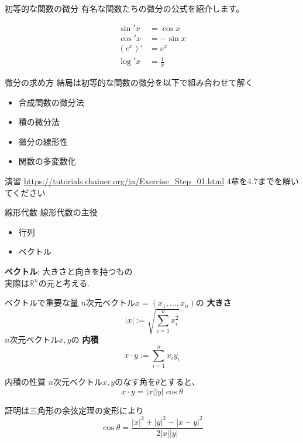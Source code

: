 \begin{frame}{初等的な関数の微分}
有名な関数たちの微分の公式を紹介します。

  \begin{align*}
  \sin' x &= \cos x \\
  \cos' x &= - \sin x \\
  (e^{x})' &= e^x \\
  \log' x &= \frac{1}{x}
  \end{align*}
\end{frame}


\begin{frame}{微分の求め方}
結局は初等的な関数の微分を以下で組み合わせて解く
\begin{itemize}
\item 合成関数の微分法
\item 積の微分法
\item 微分の線形性
\item 関数の多変数化
\end{itemize}
\end{frame}

\begin{frame}{演習}
\url{https://tutorials.chainer.org/ja/Exercise_Step_01.html}
4章を4.7までを解いてください
\end{frame}

\begin{frame}{線形代数}
線形代数の主役
\begin{itemize}
  \item 行列
  \item ベクトル
\end{itemize}
\textbf{ベクトル}: 大きさと向きを持つもの \\
実際は$\mathbb{R}^n$の元と考える.
\end{frame}


\begin{frame}{ベクトルで重要な量}
$n$次元ベクトル$x = (x_1,\dots,x_n)$の \textbf{大きさ}
  \begin{equation*}
  |x|:= \sqrt{\sum_{i=1}^n x_i^2 }
  \end{equation*}
$n$次元ベクトル$x, y$の \textbf{内積}
\begin{equation*}
 x \cdot y := \sum_{i=1}^n x_iy_i
\end{equation*}
\end{frame}

\begin{frame}{内積の性質}
$n$次元ベクトル$x, y$のなす角を$\theta$とすると、
  \begin{equation*}
   x\cdot y = |x||y| \cos \theta
  \end{equation*}

証明は三角形の余弦定理の変形により
\begin{equation*}
\cos \theta = \frac{|x|^2 + |y|^2 - |x-y|^2}{2 |x| |y|}
\end{equation*}

\end{frame}


